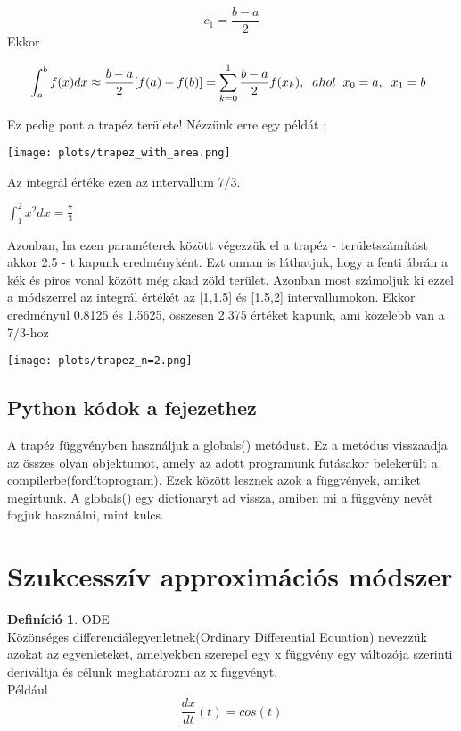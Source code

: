 \documentclass{article}
\theoremstyle{definition}
\theoremstyle{theorem}
\newtheorem{definition}{Definíció}
\begin{document}
\begin{equation*}
c_1 = \frac{b-a}{2}
\end{equation*}
Ekkor

\begin{equation*}
    \int_a^b f(x) dx \approx \frac{b-a}{2}[f(a) + f(b)] = \sum_{k=0}^{1} \frac{b-a}{2} f(x_k),\\
    \;\;ahol \;\;x_0 = a,\;\;x_1=b
    \;\;
\end{equation*}

Ez pedig pont a trapéz területe! Nézzünk erre egy példát :
\newline

\texttt{[image: plots/trapez\_with\_area.png]}

Az integrál értéke ezen az intervallum 7/3.
\begin{center}
$\int_{1}^{2} x ^2 dx = \frac{7}{3}$
\end{center}
Azonban, ha ezen paraméterek között végezzük el a trapéz - területszámítást akkor 2.5 - t kapunk eredményként. Ezt onnan is láthatjuk, hogy a fenti ábrán a kék és piros vonal között még akad zöld terület. Azonban most számoljuk ki ezzel a módszerrel az integrál értékét az [1,1.5] és [1.5,2] intervallumokon. Ekkor eredményül 0.8125 és 1.5625, összesen 2.375 értéket kapunk, ami közelebb van a 7/3-hoz

\texttt{[image: plots/trapez\_n=2.png]}

\subsection{Python kódok a fejezethez}
A trapéz függvényben használjuk a globals() metódust. Ez a metódus visszaadja az összes olyan objektumot, amely az adott programunk futásakor belekerült a compilerbe(fordítoprogram). Ezek között lesznek azok a függvények, amiket megírtunk. A globals() egy dictionaryt ad vissza, amiben mi a függvény nevét fogjuk használni, mint kulcs.



\section{Szukcesszív approximációs módszer}

\begin{definition}{ODE}\\
Közönséges differenciálegyenletnek(Ordinary Differential Equation) nevezzük azokat az egyenleteket, amelyekben szerepel egy x függvény egy változója szerinti deriváltja és célunk meghatározni az x függvényt.\\
Például
\begin{equation*}
    \frac{dx}{dt} (t) = cos(t)
\end{equation*}
\end{definition}
\end{document}
